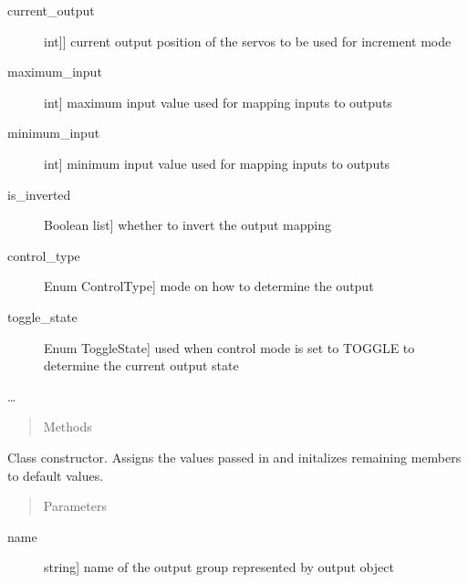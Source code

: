 \documentclass[letterpaper,10pt,english]{sphinxmanual}
\begin{document}
\begin{fulllineitems}
\begin{description}
\item[{current\_output}] \leavevmode{[}{[}int{]}{]}
\sphinxAtStartPar
current output position of the servos to be used for increment mode

\item[{maximum\_input}] \leavevmode{[}int{]}
\sphinxAtStartPar
maximum input value used for mapping inputs to outputs

\item[{minimum\_input}] \leavevmode{[}int{]}
\sphinxAtStartPar
minimum input value used for mapping inputs to outputs

\item[{is\_inverted}] \leavevmode{[}Boolean list{]}
\sphinxAtStartPar
whether to invert the output mapping

\item[{control\_type}] \leavevmode{[}Enum ControlType{]}
\sphinxAtStartPar
mode on how to determine the output

\item[{toggle\_state}] \leavevmode{[}Enum ToggleState{]}
\sphinxAtStartPar
used when control mode is set to TOGGLE to determine the current output state

\end{description}

\sphinxAtStartPar
…
\begin{quote}\begin{description}
\item[{Methods}] \leavevmode
\end{description}\end{quote}

\begin{fulllineitems}
\label{\detokenize{generic:AnalogOutputObject.AnalogOutputObject.__init__}}
\sphinxAtStartPar
Class constructor. Assigns the values passed in and initalizes remaining members to default values.
\begin{quote}\begin{description}
\item[{Parameters}] \leavevmode
\end{description}\end{quote}
\begin{description}
\item[{name}] \leavevmode{[}string{]}
\sphinxAtStartPar
name of the output group represented by output object


\end{description}
\end{fulllineitems}
\end{fulllineitems}
\end{document}
